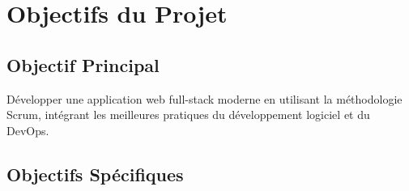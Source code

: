 \section{Objectifs du Projet}

\subsection{Objectif Principal}

Développer une application web full-stack moderne en utilisant la méthodologie Scrum, intégrant les meilleures pratiques du développement logiciel et du DevOps.

\subsection{Objectifs Spécifiques}

